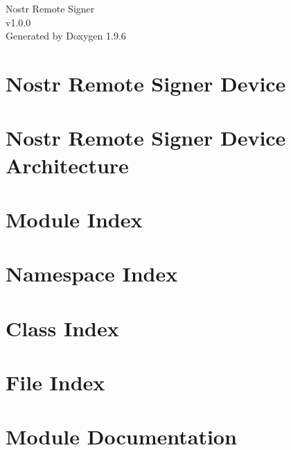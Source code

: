 \documentclass[twoside]{book}
\newcommand{\+}{\discretionary{\mbox{\scriptsize$\hookleftarrow$}}{}{}}
\newcommand{\clearemptydoublepage}{%
    \newpage{\pagestyle{empty}\cleardoublepage}%
  }
\begin{document}
  \raggedbottom
    \hypersetup{pageanchor=false,
                bookmarksnumbered=true,
                pdfencoding=unicode
               }
  \begin{titlepage}
  \vspace*{7cm}
  \begin{center}%
  {\Large Nostr Remote Signer}\\
  [1ex]\large v1.\+0.\+0 \\
  \vspace*{1cm}
  {\large Generated by Doxygen 1.9.6}\\
  \end{center}
  \end{titlepage}
  \clearemptydoublepage
  \tableofcontents
  \clearemptydoublepage
  \hypersetup{pageanchor=true}
\chapter{Nostr Remote Signer Device}
\label{index}\hypertarget{index}{}
\chapter{Nostr Remote Signer Device Architecture}
\label{md__a_r_c_h_i_t_e_c_t_u_r_e}

\chapter{Module Index}

\chapter{Namespace Index}

\chapter{Class Index}

\chapter{File Index}

\chapter{Module Documentation}



\end{document}
